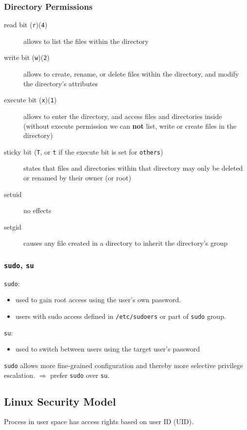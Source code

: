 \subsubsection{Directory Permissions}
\begin{description}
  \item[read bit (\texttt{r})(\texttt{4})] allows to list the files within the directory
  \item[write bit (\texttt{w})(\texttt{2})] allows to create, rename, or delete files
    within the directory, and modify the directory's attributes
  \item[execute bit (\texttt{x})(\texttt{1})] allows  to enter the directory, and access files and directories inside (without execute permission we can \textbf{not} list, write or create files in the directory)
  \item[sticky bit (\texttt{T}, or \texttt{t} if the execute bit is set for
    \texttt{others})] states that files and directories within that directory
    may only be deleted or renamed by their owner (or root)
  \item[setuid] no effects
  \item[setgid] causes any file created in a directory to inherit the
    directory's group
\end{description}

\subsubsection{\texttt{sudo}, \texttt{su}}

\texttt{sudo}:
\begin{itemize}
  \item used to gain root access using the user's own password.
  \item users with sudo access defined in \texttt{/etc/sudoers} or part of \texttt{sudo} group.
\end{itemize}
\texttt{su}:
\begin{itemize}
  \item used to switch between users using the target user's password
\end{itemize}
\texttt{sudo} allows more fine-grained configuration and thereby more selective
privilege escalation. $\Rightarrow$ prefer \texttt{sudo} over \texttt{su}.

\subsection{Linux Security Model}
Process in user space has access rights based on user ID (UID).

